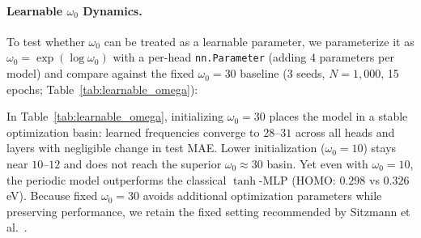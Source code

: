 \documentclass[10pt,twocolumn,letterpaper]{article}
\begin{document}
\paragraph{Learnable $\omega_0$ Dynamics.}
To test whether $\omega_0$ can be treated as a learnable parameter, we parameterize it as $\omega_0 = \exp(\log \omega_0)$ with a per-head \texttt{nn.Parameter} (adding 4 parameters per model) and compare against the fixed $\omega_0 = 30$ baseline (3 seeds, $N = 1{,}000$, 15 epochs; Table~\ref{tab:learnable_omega}):

\begin{table}[ht]
\centering
\small
\caption{\textbf{Learnable $\omega_0$ Experiment} ($N = 1{,}000$, 3 seeds). Test MAE (eV). When initialized at 30, learnable $\omega_0$ converges to $28$--$31$ across all heads and layers, matching fixed $\omega_0 = 30$ performance. When initialized at 10, $\omega_0$ remains near $10$--$12$ and does not escape to the superior $\omega_0 \approx 30$ basin.}
\label{tab:learnable_omega}
\end{table}

In Table~\ref{tab:learnable_omega}, initializing $\omega_0 = 30$ places the model in a stable optimization basin: learned frequencies converge to $28$--$31$ across all heads and layers with negligible change in test MAE. Lower initialization ($\omega_0 = 10$) stays near $10$--$12$ and does not reach the superior $\omega_0 \approx 30$ basin. Yet even with $\omega_0 = 10$, the periodic model outperforms the classical $\tanh$-MLP (HOMO: $0.298$ vs $0.326$\,eV). Because fixed $\omega_0 = 30$ avoids additional optimization parameters while preserving performance, we retain the fixed setting recommended by Sitzmann et al.~\cite{sitzmann2020siren}.
\end{document}
